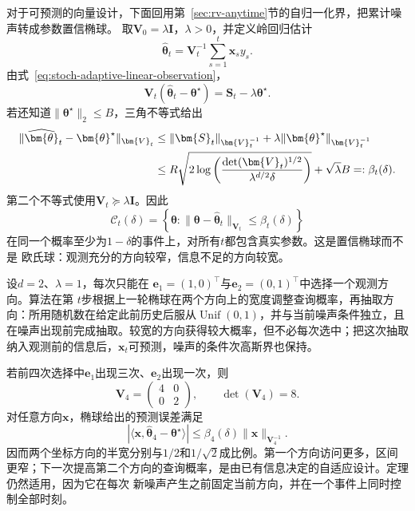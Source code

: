对于可预测的向量设计，下面回用第~\ref{sec:rv-anytime}节的自归一化界，把累计噪声转成参数置信椭球。
取$\bm{V}_0=\lambda\bm{I}$，$\lambda>0$，并定义岭回归估计
\begin{equation}
  \widehat{\bm{\theta}}_t
  =\bm{V}_t^{-1}\sum_{s=1}^{t}\bm{x}_s y_s.
  \label{eq:stoch-ridge-estimator}
\end{equation}
由式~\eqref{eq:stoch-adaptive-linear-observation}，
\[
  \bm{V}_t
  (\widehat{\bm{\theta}}_t-\bm{\theta}^{\star})
  =
  \bm{S}_t-\lambda\bm{\theta}^{\star}.
  \]
若还知道$\lVert\bm{\theta}^{\star}\rVert_2\leq B$，三角不等式给出
\begin{align}
  \lVert
    \widehat{\bm{\theta}}_t-\bm{\theta}^{\star}
  \rVert_{\bm{V}_t}
  &\leq
  \lVert\bm{S}_t\rVert_{\bm{V}_t^{-1}}
  +
  \lambda
  \lVert\bm{\theta}^{\star}\rVert_{\bm{V}_t^{-1}}
  \notag\\
  &\leq
  R\sqrt{
    2\log\left(
      \frac{\det(\bm{V}_t)^{1/2}}
           {\lambda^{d/2}\delta}
    \right)
  }
  +\sqrt{\lambda}B
  =:\beta_t(\delta).
  \label{eq:stoch-adaptive-confidence-ellipsoid}
\end{align}
第二个不等式使用$\bm{V}_t\succeq\lambda\bm{I}$。因此
\[
  \mathcal{C}_t(\delta)
  =
  \left\{
    \bm{\theta}:
    \lVert\bm{\theta}-\widehat{\bm{\theta}}_t
    \rVert_{\bm{V}_t}
    \leq\beta_t(\delta)
  \right\}
\]
在同一个概率至少为$1-\delta$的事件上，对所有$t$都包含真实参数。这是置信椭球而不是
欧氏球：观测充分的方向较窄，信息不足的方向较宽。

\begin{example}[二维自适应查询]
  \label{ex:stoch-two-dimensional-adaptive-design}
  设$d=2$、$\lambda=1$，每次只能在
  $\bm{e}_1=(1,0)^\top$与$\bm{e}_2=(0,1)^\top$中选择一个观测方向。算法在第
  $t$步根据上一轮椭球在两个方向上的宽度调整查询概率，再抽取方向：所用随机数在给定此前历史后服从\(\operatorname{Unif}(0,1)\)，并与当前噪声条件独立，且在噪声出现前完成抽取。较宽的方向获得较大概率，但不必每次选中；把这次抽取纳入观测前的信息后，$\bm{x}_t$可预测，噪声的条件次高斯界也保持。

  若前四次选择中$\bm{e}_1$出现三次、$\bm{e}_2$出现一次，则
  \[
    \bm{V}_4
    =
    \begin{pmatrix}
      4&0\\
      0&2
    \end{pmatrix},
    \qquad
    \det(\bm{V}_4)=8.
  \]
  对任意方向$\bm{x}$，椭球给出的预测误差满足
  \[
    |\langle
      \bm{x},
      \widehat{\bm{\theta}}_4-\bm{\theta}^{\star}
    \rangle|
    \leq
    \beta_4(\delta)
    \lVert\bm{x}\rVert_{\bm{V}_4^{-1}}.
  \]
  因而两个坐标方向的半宽分别与$1/2$和$1/\sqrt2$成比例。第一个方向访问更多，区间
  更窄；下一次提高第二个方向的查询概率，是由已有信息决定的自适应设计。定理仍然适用，因为它在每次
  新噪声产生之前固定当前方向，并在一个事件上同时控制全部时刻。
\end{example}

